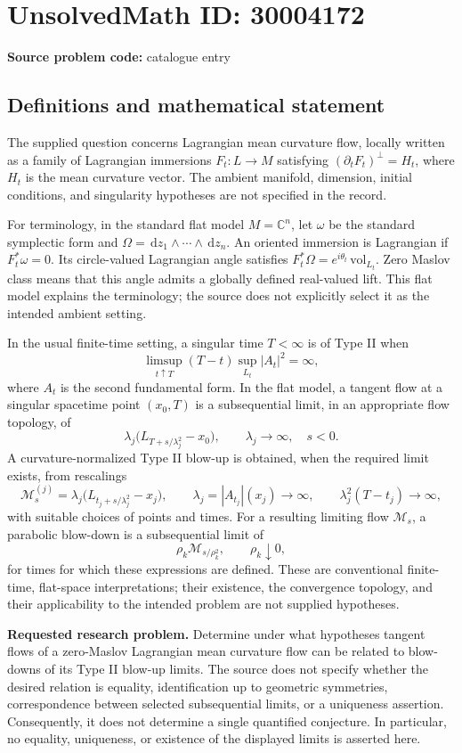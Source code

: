 \documentclass[11pt]{article}
\newcommand{\C}{\mathbb{C}}
\newcommand{\dd}{\,\mathrm{d}}
\begin{document}
\section*{UnsolvedMath ID: 30004172}
\textbf{Source problem code:} catalogue entry
\subsection{Definitions and mathematical statement}
The supplied question concerns Lagrangian mean curvature flow, locally written as a family of Lagrangian immersions \(F_t:L\to M\) satisfying \((\partial_tF_t)^\perp=H_t\), where \(H_t\) is the mean curvature vector. The ambient manifold, dimension, initial conditions, and singularity hypotheses are not specified in the record.

For terminology, in the standard flat model \(M=\C^n\), let \(\omega\) be the standard symplectic form and \(\Omega=\dd z_1\wedge\cdots\wedge\dd z_n\). An oriented immersion is Lagrangian if \(F_t^*\omega=0\). Its circle-valued Lagrangian angle satisfies \(F_t^*\Omega=e^{i\theta_t}\,\mathrm{vol}_{L_t}\). Zero Maslov class means that this angle admits a globally defined real-valued lift. This flat model explains the terminology; the source does not explicitly select it as the intended ambient setting.

In the usual finite-time setting, a singular time \(T<\infty\) is of Type II when
\[
\limsup_{t\uparrow T}(T-t)\sup_{L_t}|A_t|^2=\infty,
\]
where \(A_t\) is the second fundamental form. In the flat model, a tangent flow at a singular spacetime point \((x_0,T)\) is a subsequential limit, in an appropriate flow topology, of
\[
\lambda_j\bigl(L_{T+s/\lambda_j^2}-x_0\bigr),\qquad \lambda_j\to\infty,\quad s<0.
\]
A curvature-normalized Type II blow-up is obtained, when the required limit exists, from rescalings
\[
\mathcal M^{(j)}_s=\lambda_j\bigl(L_{t_j+s/\lambda_j^2}-x_j\bigr),
\qquad
\lambda_j=|A_{t_j}|(x_j)\to\infty,
\qquad
\lambda_j^2(T-t_j)\to\infty,
\]
with suitable choices of points and times. For a resulting limiting flow \(\mathcal M_s\), a parabolic blow-down is a subsequential limit of
\[
\rho_k\mathcal M_{s/\rho_k^2},\qquad \rho_k\downarrow0,
\]
for times for which these expressions are defined. These are conventional finite-time, flat-space interpretations; their existence, the convergence topology, and their applicability to the intended problem are not supplied hypotheses.

\textbf{Requested research problem.} Determine under what hypotheses tangent flows of a zero-Maslov Lagrangian mean curvature flow can be related to blow-downs of its Type II blow-up limits. The source does not specify whether the desired relation is equality, identification up to geometric symmetries, correspondence between selected subsequential limits, or a uniqueness assertion. Consequently, it does not determine a single quantified conjecture. In particular, no equality, uniqueness, or existence of the displayed limits is asserted here.
\end{document}
